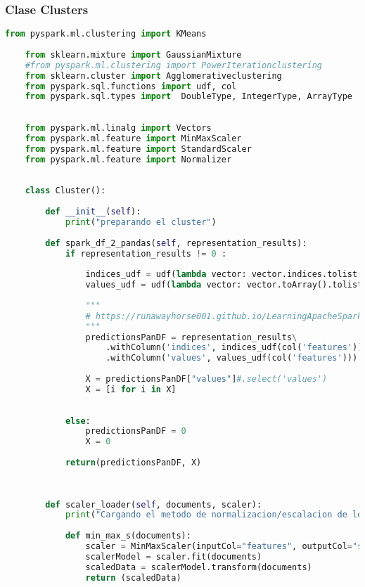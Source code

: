 \documentclass[12pt]{article}
\begin{document}
	
	\subsubsection*{ Clase Clusters}
	\begin{lstlisting}[language=Python, caption = Clase Clusters]
	from pyspark.ml.clustering import KMeans
	
	from sklearn.mixture import GaussianMixture
	#from pyspark.ml.clustering import PowerIterationclustering
	from sklearn.cluster import Agglomerativeclustering
	from pyspark.sql.functions import udf, col
	from pyspark.sql.types import  DoubleType, IntegerType, ArrayType
	
	
	from pyspark.ml.linalg import Vectors
	from pyspark.ml.feature import MinMaxScaler
	from pyspark.ml.feature import StandardScaler
	from pyspark.ml.feature import Normalizer
	
	
	class Cluster():
	    
	    def __init__(self):
	        print("preparando el cluster")
	        
	    def spark_df_2_pandas(self, representation_results):
	        if representation_results != 0 :
	                            
	            indices_udf = udf(lambda vector: vector.indices.tolist(), ArrayType(IntegerType()))
	            values_udf = udf(lambda vector: vector.toArray().tolist(), ArrayType(DoubleType()))
	            
	            """
	            # https://runawayhorse001.github.io/LearningApacheSpark/manipulation.html
	            """
	            predictionsPanDF = representation_results\
	                .withColumn('indices', indices_udf(col('features')))\
	                .withColumn('values', values_udf(col('features'))).toPandas()
	                
	            X = predictionsPanDF["values"]#.select('values')
	            X = [i for i in X]
	            
	            
	        else:
	            predictionsPanDF = 0
	            X = 0
	            
	        return(predictionsPanDF, X)
	    
	    
	
	    def scaler_loader(self, documents, scaler):
	        print("Cargando el metodo de normalizacion/escalacion de los datos")
	        
	        def min_max_s(documents):
	            scaler = MinMaxScaler(inputCol="features", outputCol="scaled_features")
	            scalerModel = scaler.fit(documents)
	            scaledData = scalerModel.transform(documents)
	            return (scaledData)
	        

\end{lstlisting}
\end{document}
